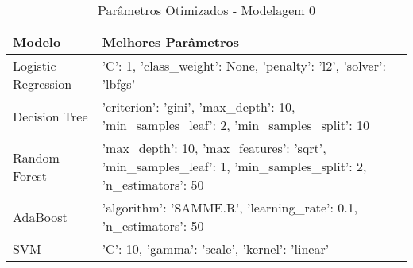 \begin{table}[H] %
    \centering
    \caption{Parâmetros Otimizados - Modelagem 0}
    \label{tab:melhores_parametros_modelagem_0}
    \renewcommand{\arraystretch}{1.25} %
    \begin{adjustwidth}{ -1in }{ -1in } %
    \centering %
    \small %
    \begin{tabular}{ll}
\toprule
             Modelo &                                                                                          Melhores Parâmetros \\
\midrule
Logistic Regression &                                           {'C': 1, 'class_weight': None, 'penalty': 'l2', 'solver': 'lbfgs'} \\
      Decision Tree &                       {'criterion': 'gini', 'max_depth': 10, 'min_samples_leaf': 2, 'min_samples_split': 10} \\
      Random Forest & {'max_depth': 10, 'max_features': 'sqrt', 'min_samples_leaf': 1, 'min_samples_split': 2, 'n_estimators': 50} \\
           AdaBoost &                                           {'algorithm': 'SAMME.R', 'learning_rate': 0.1, 'n_estimators': 50} \\
                SVM &                                                              {'C': 10, 'gamma': 'scale', 'kernel': 'linear'} \\
\bottomrule
\end{tabular}
    \end{adjustwidth}
    \renewcommand{\arraystretch}{1.0} %
\end{table}
